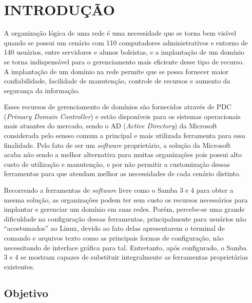 \chapter{INTRODUÇÃO}

A organização lógica de uma rede é uma necessidade que se torna bem visível quando se possui um cenário com 110 computadores administrativos e entorno de 140 usuários, entre servidores e alunos bolsistas, e a implantação de um domínio se torna indispensável para o gerenciamento mais eficiente desse tipo de recurso. A implantação de um domínio na rede permite que se possa fornecer maior confiabilidade, facilidade de manutenção, controle de recursos e aumento da segurança da informação.

Esses recursos de gerenciamento de domínios são fornecidos através de PDC (\textit{Primary Domain Controller}) e estão disponíveis para os sistemas operacionais mais atuantes do mercado, sendo o AD (\textit{Active Directory}) da Microsoft considerada pelo sensso comum a principal e mais utilizada ferramenta para essa finalidade. Pelo fato de ser um \textit{software} proprietário, a solução da Microsoft acaba não sendo a melhor alternativa para muitas organizações pois possui alto custo de utilização e manutenção, e por não permitir a customização dessas ferramentas para que atendam melhor as necessidades de cada cenário distinto.

Recorrendo a ferramentas de \textit{software} livre como o Samba 3 e 4 para obter a mesma solução, as organizações podem ter sem custo os recursos necessários para implantar e gerenciar um domínio em suas redes. Porém, percebe-se uma grande dificuldade na configuração dessas ferramentas, principalmente para usuários não “acostumados” ao Linux, devido ao fato delas apresentarem o terminal de comando e arquivos texto como as principais formas de configuração, não necessitando de interface gráfica para tal. Entretanto, após configurado, o Samba 3 e 4 se mostram capazes de substituir integralmente as ferramentas proprietárias existentes.

\section{Objetivo}

